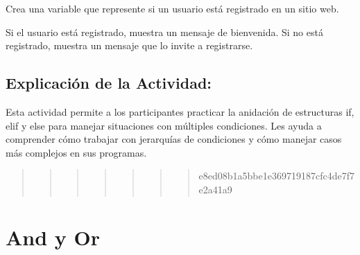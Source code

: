 \documentclass[
  a4paper,
  onepage,
  openany]{scrreprt}
\begin{document}
\begin{tcolorbox}[enhanced jigsaw, breakable, opacityback=0, toptitle=1mm, coltitle=black, toprule=.15mm, rightrule=.15mm, colframe=quarto-callout-important-color-frame, opacitybacktitle=0.6, arc=.35mm, title=\textcolor{quarto-callout-important-color}{\faExclamation}\hspace{0.5em}{Actividad Práctica:}, titlerule=0mm, colbacktitle=quarto-callout-important-color!10!white, bottomtitle=1mm, bottomrule=.15mm, colback=white, left=2mm, leftrule=.75mm]

Crea una variable que represente si un usuario está registrado en un
sitio web.

Si el usuario está registrado, muestra un mensaje de bienvenida. Si no
está registrado, muestra un mensaje que lo invite a registrarse.

\end{tcolorbox}

\hypertarget{explicaciuxf3n-de-la-actividad-31}{%
\section{Explicación de la
Actividad:}\label{explicaciuxf3n-de-la-actividad-31}}

Esta actividad permite a los participantes practicar la anidación de
estructuras if, elif y else para manejar situaciones con múltiples
condiciones. Les ayuda a comprender cómo trabajar con jerarquías de
condiciones y cómo manejar casos más complejos en sus programas.

\begin{quote}
\begin{quote}
\begin{quote}
\begin{quote}
\begin{quote}
\begin{quote}
\begin{quote}
e8ed08b1a5bbe1e369719187cfc4de7f7e2a41a9
\end{quote}
\end{quote}
\end{quote}
\end{quote}
\end{quote}
\end{quote}
\end{quote}

\hypertarget{and-y-or}{%
\chapter{And y Or}\label{and-y-or}}
\end{document}

